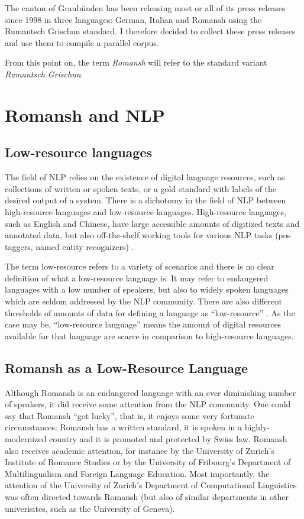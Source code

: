 The canton of Graubünden has been releasing most or all of its press releases since 1998 in three languages: German, Italian and Romansh using the Rumantsch Grischun standard. 
I therefore decided to collect these press releases and use them to compile a parallel corpus. 

From this point on, the term \emph{Romansh} will refer to the standard variant \emph{Rumantsch Grischun}.

\section{Romansh and NLP}
\subsection{Low-resource languages}
The field of \acrfull{NLP} relies on the existence of digital language resources, such as collections of written or spoken texts, or a gold standard with labels of the desired output of a system. 
There is a dichotomy in the field of \acrshort{NLP} between high-resource languages and low-resource languages. 
High-resource languages, such as English and Chinese, have large accessible amounts of digitized texts and annotated data, but also  off-the-shelf working tools for various \acrshort{NLP} tasks (\acrshort{pos} taggers, named entity recognizers) \autocite{bender-2019}.

The term low-resource refers to a variety of scenarios and there is no  clear definition of what a low-resource language is. 
It may refer to endangered languages with a low number of speakers, but also to widely spoken languages which are seldom addressed by the NLP community. 
There are also different thresholds of amounts of data for defining a language as \enquote{low-resource} \autocite{hedderich-etal-2021-survey}. 
As the case may be, \enquote{low-resource language} means the amount of digital resources available for that language are scarce in comparison to high-resource languages.

\subsection{Romansh as a Low-Resource Language}
Although Romansh is an endangered language with an ever diminishing number of speakers, it did receive some attention from the \acrshort{NLP} community.
One could say that Romansh \enquote{got lucky}, that is, it enjoys some very  fortunate circumstances: 
Romansh has a written standard, it is spoken in a highly-modernized country and it is promoted and protected by Swiss law. Romansh also receives academic attention, for instance  by the University of Zurich's Institute of Romance Studies or by the University of Fribourg's Department of Multilingualism and Foreign Language Education. 
Most importantly, the attention of the University of Zurich's Department of Computational Linguistics  was often directed towards Romansh (but also of similar departments in other univerisites, such as the University of Geneva).

